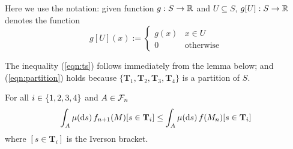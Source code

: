 Here we use the notation: given function $g : S \to \mathbb{R}$ and $U \subseteq S$, $g[U] : S \to \mathbb{R}$ denotes the function
\[
g[U](x) :=
\begin{cases}
g(x) & \textrm{$x \in U$}\\
0 & \textrm{otherwise}
\end{cases}
\]

The inequality (\ref{eqn:ts}) follows immediately from the lemma below; 
and (\ref{eqn:partition}) holds because $\{\mathbf{T}_1, \mathbf{T}_2, \mathbf{T}_3, \mathbf{T}_4\}$ is a partition of $S$.
\fi

\begin{lemma}
\label{lem:key rankable}
For all $i \in \{1, 2, 3, 4\}$ and $A \in \mathcal{F}_n$
\[
\int_A \mu(\mathrm{d} s) \, f_{n+1}(M)[s \in \mathbf{T}_i] \leq \int_A \mu(\mathrm{d} s) \, f(M_n)[s \in \mathbf{T}_i]
\] 
where $[s \in \mathbf{T}_i]$ is the Iverson bracket.
\end{lemma}

